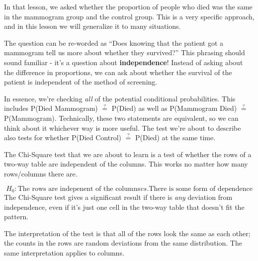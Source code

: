 \documentclass[
  letterpaper,
  DIV=11,
  numbers=noendperiod]{scrreprt}
\begin{document}
In that lesson, we asked whether the proportion of people who died was
the same in the mammogram group and the control group. This is a very
specific approach, and in this lesson we will generalize it to many
situations.

The question can be re-worded as ``Does knowing that the patient got a
mammogram tell us more about whether they survived?'' This phrasing
should sound familiar - it's a question about \textbf{independence}!
Instead of asking about the difference in proportions, we can ask about
whether the survival of the patient is independent of the method of
screening.

In essence, we're checking \emph{all} of the potential conditional
probabilities. This includes P(Died \textbar{} Mammogram)
\(\stackrel{?}{=}\) P(Died) as well as P(Mammogram \textbar{} Died)
\(\stackrel{?}{=}\) P(Mammogram). Technically, these two statements are
equivalent, so we can think about it whichever way is more useful. The
test we're about to describe also tests for whether P(Died \textbar{}
Control) \(\stackrel{?}{=}\) P(Died) at the same time.

\begin{tcolorbox}[enhanced jigsaw, toptitle=1mm, colbacktitle=quarto-callout-note-color!10!white, breakable, leftrule=.75mm, left=2mm, opacityback=0, colframe=quarto-callout-note-color-frame, rightrule=.15mm, toprule=.15mm, bottomtitle=1mm, titlerule=0mm, title=\textcolor{quarto-callout-note-color}{\faInfo}\hspace{0.5em}{Test for Independence of Columns and Rows}, arc=.35mm, colback=white, bottomrule=.15mm, opacitybacktitle=0.6, coltitle=black]

The Chi-Square test that we are about to learn is a test of whether the
rows of a two-way table are independent of the columns. This works no
matter how many rows/columns there are.

\[
H_0: \text{The rows are indepenent of the columns} vs. \text{There is some form of dependence}
\] The Chi-Square test gives a significant result if there is \emph{any}
deviation from independence, even if it's just one cell in the two-way
table that doesn't fit the pattern.

\end{tcolorbox}

The interpretation of the test is that all of the rows look the same as
each other; the counts in the rows are random deviations from the same
distribution. The same interpretation applies to columns.
\end{document}

